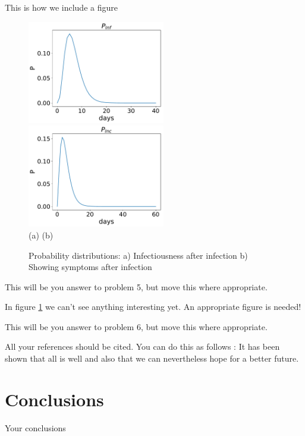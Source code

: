 \documentclass{mm2}
\begin{document}
This is how we include a figure
\begin{figure}[ht!]
  \centering
  \includegraphics[width=60mm]{Pi.pdf}
  \includegraphics[width=60mm]{Pinc.pdf}\\
  \hspace{5mm}(a) \hspace{55mm} (b)\\
\caption{Probability distributions: a) Infectiousness after infection b) Showing symptoms after infection
\label{fig:probs}}
\end{figure}

\vspace{5mm}
\begin{answer}{5}
  This will be you answer to problem 5, but move this where appropriate.
\end{answer}

In figure \ref{fig:probs} we can't see anything interesting yet.
An appropriate figure is needed!

\vspace{5mm}
\begin{answer}{6}
  This will be you answer to problem 6, but move this where appropriate.
\end{answer}

All your references should be cited. You can do this as follows
: It has been shown that \cite{Imperial2020} all is well and also
that\cite{Lauer2020} we can nevertheless hope for a better future.



\section{Conclusions}
Your conclusions
\end{document}
